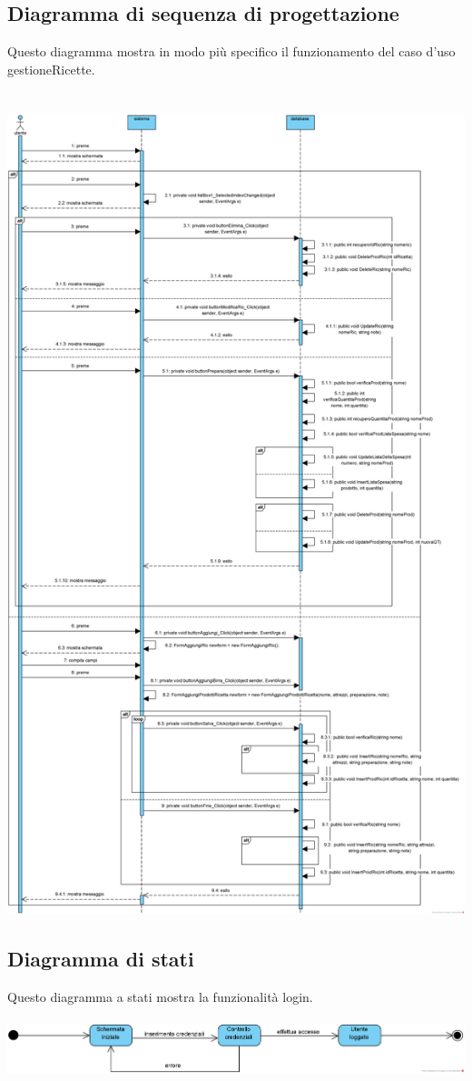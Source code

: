 \documentclass[a4paper, titlepage]{article}
\begin{document}
\newpage

\subsection{Diagramma di sequenza di progettazione}
Questo diagramma mostra in modo più specifico il funzionamento del caso d'uso gestioneRicette.\\\\\
\includegraphics[scale=0.43]{Immagini/Sequence Diagram gestioneRicette.png}
\subsection{Diagramma di stati}
Questo diagramma a stati mostra la funzionalità login.\\\\
\includegraphics[scale=0.60]{Immagini/State Machine Diagram Login_Brew Day!.png}
\end{document}
